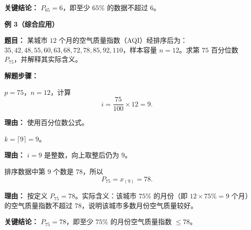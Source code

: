 \begin{examplebox}
	\textbf{\textcolor{CExample}{关键结论：}}
	\textbf{$P_{65}=6$}，即至少 $65\text{\%}$ 的数据不超过 $6$。

	\medskip
	\textbf{\textcolor{CExample}{例 3（综合应用）}}

	\textbf{\textcolor{CExample}{题目：}}
	某城市 $12$ 个月的空气质量指数（AQI）经排序后为：$35,42,48,55,60,63,68,72,78,85,92,110$，样本容量 $n=12$。求第 $75$ 百分位数 $P_{75}$，并解释其实际含义。

	\textbf{\textcolor{CExample}{解题步骤：}}
	\begin{description}[style=nextline, leftmargin=2.8em, labelsep=0.5em, itemsep=0.45em]
		\item[\textbf{第一步（计算比例位置）：}] $p=75$，$n=12$，计算
			\[
				i = \frac{75}{100}\times 12 = 9.
			\]
			\par\textbf{理由：} 使用百分位数公式。
		\item[\textbf{第二步（确定下标）：}] $k = \lceil 9 \rceil = 9$。
			\par\textbf{理由：} $i=9$ 是整数，向上取整后仍为 $9$。
		\item[\textbf{第三步（读取数据并解释含义）：}] 排序数据中第 $9$ 个数是 $78$，所以
			\[
				P_{75} = x_{(9)} = 78.
			\]
			\par\textbf{理由：} 按定义 $P_{75}=78$。实际含义：该城市 $75\text{\%}$ 的月份（即 $12\times 75\text{\%}=9$ 个月）的空气质量指数不超过 $78$，说明该城市多数月份空气质量较好。
	\end{description}

	\textbf{\textcolor{CExample}{关键结论：}}
	\textbf{$P_{75}=78$}，即至少 $75\text{\%}$ 的月份空气质量指数 $\le 78$。
\end{examplebox}

